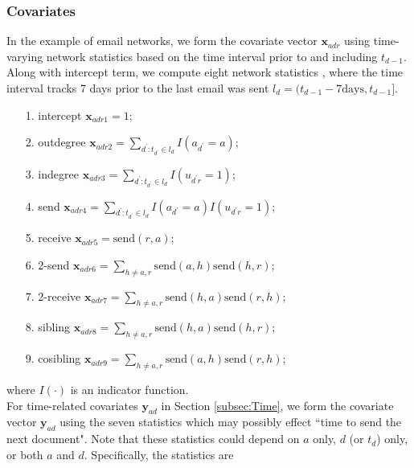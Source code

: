 \documentclass[12pt]{article}
\begin{document}
 	   \subsubsection{Covariates}\label{subsec:Covariates_email}
In the example of email networks, we form the covariate vector $\boldsymbol{x}_{adr}$ using time-varying network statistics based on the time interval prior to and including $t_{d-1}$. Along with intercept term, we compute eight network statistics \cite{PerryWolfe2012}, where the time interval tracks 7 days prior to the last email was sent $l_d = (t_{d-1}-7\mbox{days}, t_{d-1}]$. 
\begin{itemize}
	\item[1.] intercept $\boldsymbol{x}_{adr1} =1$;
	\item[2.] outdegree $\boldsymbol{x}_{adr2} =\sum\limits_{d^\prime: t_{d^\prime} \in l_d} I(a_{d^\prime} = a)$;
	\item[3.] indegree $\boldsymbol{x}_{adr3}=\sum\limits_{d^\prime: t_{d^\prime} \in l_d} I(u_{d^\prime r} = 1)$;
	\item[4.] send $\boldsymbol{x}_{adr4}=\sum\limits_{d^\prime: t_{d^\prime} \in l_d} I(a_{d^\prime} = a)I(u_{d^\prime r} = 1)$;
	\item[5.] receive $\boldsymbol{x}_{adr5}=\mbox{send}(r,a)$;
	\item[6.] 2-send $\boldsymbol{x}_{adr6} = \sum\limits_{h \neq a, r} \mbox{send}(a,h)\mbox{send}(h,r)$;
	\item[7.] 2-receive $\boldsymbol{x}_{adr7}= \sum\limits_{h \neq a, r} \mbox{send}(h,a)\mbox{send}(r,h)$;
	\item[8.] sibling $\boldsymbol{x}_{adr8}=\sum\limits_{h \neq a, r} \mbox{send}(h,a)\mbox{send}(h,r)$;
	\item[9.] cosibling $\boldsymbol{x}_{adr9}=\sum\limits_{h \neq a, r} \mbox{send}(a,h)\mbox{send}(r,h)$;
\end{itemize}
where $I(\cdot)$ is an indicator function.\\ \newline
For time-related covariates $\boldsymbol{y}_{ad}$ in Section \ref{subsec:Time}, we form the covariate vector $\boldsymbol{y}_{ad}$ using the seven statistics which may possibly effect ``time to send the next document". Note that these statistics could depend on $a$ only, $d$ (or $t_d$) only, or both $a$ and $d$. Specifically, the statistics are
\end{document}
